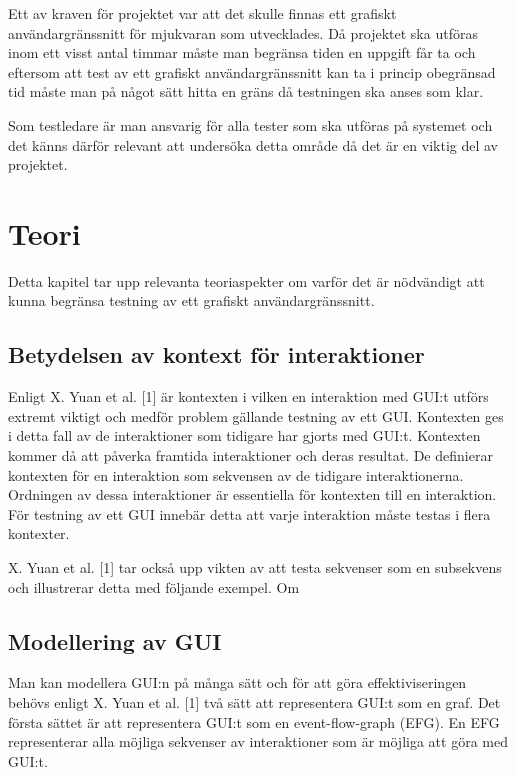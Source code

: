 Ett av kraven för projektet var att det skulle finnas ett grafiskt användargränssnitt för mjukvaran som utvecklades. Då projektet ska utföras inom ett visst antal timmar måste man begränsa tiden en uppgift får ta och eftersom att test av ett grafiskt användargränssnitt kan ta i princip obegränsad tid måste man på något sätt hitta en gräns då testningen ska anses som klar.

Som testledare är man ansvarig för alla tester som ska utföras på systemet och det känns därför relevant att undersöka detta område då det är en viktig del av projektet.

\section{Teori}
\label{sec:theory-holmberg}

Detta kapitel tar upp relevanta teoriaspekter om varför det är nödvändigt att kunna begränsa testning av ett grafiskt användargränssnitt.

\subsection{Betydelsen av kontext för interaktioner}

Enligt X. Yuan et al. [1] är kontexten i vilken en interaktion med GUI:t utförs extremt viktigt och medför problem gällande testning av ett GUI. Kontexten ges i detta fall av de interaktioner som tidigare har gjorts med GUI:t. Kontexten kommer då att påverka framtida interaktioner och deras resultat. De definierar kontexten för en interaktion som sekvensen av de tidigare interaktionerna. Ordningen av dessa interaktioner är essentiella för kontexten till en interaktion. För testning av ett GUI innebär detta att varje interaktion måste testas i flera kontexter.

X. Yuan et al. [1] tar också upp vikten av att testa sekvenser som en subsekvens och illustrerar detta med följande exempel. Om

\subsection{Modellering av GUI}

Man kan modellera GUI:n på många sätt och för att göra effektiviseringen behövs enligt X. Yuan et al. [1] två sätt att representera GUI:t som en graf. Det första sättet är att representera GUI:t som en event-flow-graph (EFG). En EFG representerar alla möjliga sekvenser av interaktioner som är möjliga att göra med GUI:t. 

